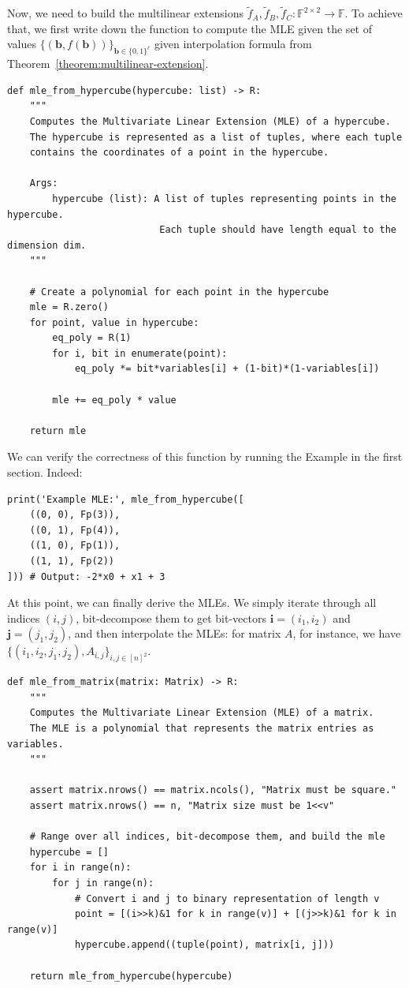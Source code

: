 \documentclass[../../book.tex]{subfiles}
\begin{document}
Now, we need to build the multilinear extensions $\widetilde{f}_A,
\widetilde{f}_B, \widetilde{f}_C: \mathbb{F}^{2 \times 2} \to \mathbb{F}$. To
achieve that, we first write down the function to compute the MLE given the set
of values $\{(\boldsymbol{b}, f(\boldsymbol{b}))\}_{\boldsymbol{b} \in
\{0,1\}^{\ell}}$ given interpolation formula from
Theorem~\ref{theorem:multilinear-extension}.
\begin{verbatim}
def mle_from_hypercube(hypercube: list) -> R:
    """
    Computes the Multivariate Linear Extension (MLE) of a hypercube.
    The hypercube is represented as a list of tuples, where each tuple
    contains the coordinates of a point in the hypercube.

    Args:
        hypercube (list): A list of tuples representing points in the hypercube.
                           Each tuple should have length equal to the dimension dim.
    """

    # Create a polynomial for each point in the hypercube
    mle = R.zero()
    for point, value in hypercube:
        eq_poly = R(1)
        for i, bit in enumerate(point):
            eq_poly *= bit*variables[i] + (1-bit)*(1-variables[i])

        mle += eq_poly * value
    
    return mle
\end{verbatim}

We can verify the correctness of this function by running the Example in the
first section. Indeed:
\begin{verbatim}
print('Example MLE:', mle_from_hypercube([
    ((0, 0), Fp(3)),
    ((0, 1), Fp(4)),
    ((1, 0), Fp(1)),
    ((1, 1), Fp(2))
])) # Output: -2*x0 + x1 + 3
\end{verbatim}

At this point, we can finally derive the MLEs. We simply iterate through all
indices $(i,j)$, bit-decompose them to get bit-vectors
$\boldsymbol{i}=(i_1,i_2)$ and $\boldsymbol{j}=(j_1,j_2)$, and then interpolate
the MLEs: for matrix $A$, for instance, we have $\{(i_1,i_2,j_1,j_2),
A_{i,j}\}_{i,j \in [n]^2}$.
\begin{verbatim}
def mle_from_matrix(matrix: Matrix) -> R:
    """
    Computes the Multivariate Linear Extension (MLE) of a matrix.
    The MLE is a polynomial that represents the matrix entries as variables.
    """
    
    assert matrix.nrows() == matrix.ncols(), "Matrix must be square."
    assert matrix.nrows() == n, "Matrix size must be 1<<v"

    # Range over all indices, bit-decompose them, and build the mle
    hypercube = []
    for i in range(n):
        for j in range(n):
            # Convert i and j to binary representation of length v
            point = [(i>>k)&1 for k in range(v)] + [(j>>k)&1 for k in range(v)]
            hypercube.append((tuple(point), matrix[i, j]))

    return mle_from_hypercube(hypercube)
\end{verbatim}
\end{document}
